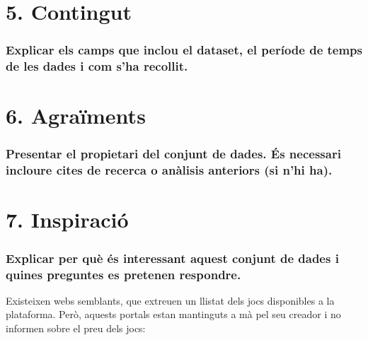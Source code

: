 \documentclass[]{article}
\begin{document}
\hypertarget{contingut}{%
\section{5. Contingut}\label{contingut}}

\hypertarget{explicar-els-camps-que-inclou-el-dataset-el-peruxedode-de-temps-de-les-dades-i-com-sha-recollit.}{%
\subsubsection{Explicar els camps que inclou el dataset, el període de
temps de les dades i com s'ha
recollit.}\label{explicar-els-camps-que-inclou-el-dataset-el-peruxedode-de-temps-de-les-dades-i-com-sha-recollit.}}

\hypertarget{agrauxefments}{%
\section{6. Agraïments}\label{agrauxefments}}

\hypertarget{presentar-el-propietari-del-conjunt-de-dades.-uxe9s-necessari-incloure-cites-de-recerca-o-anuxe0lisis-anteriors-si-nhi-ha.}{%
\subsubsection{Presentar el propietari del conjunt de dades. És
necessari incloure cites de recerca o anàlisis anteriors (si n'hi
ha).}\label{presentar-el-propietari-del-conjunt-de-dades.-uxe9s-necessari-incloure-cites-de-recerca-o-anuxe0lisis-anteriors-si-nhi-ha.}}

\hypertarget{inspiraciuxf3}{%
\section{7. Inspiració}\label{inspiraciuxf3}}

\hypertarget{explicar-per-quuxe8-uxe9s-interessant-aquest-conjunt-de-dades-i-quines-preguntes-es-pretenen-respondre.}{%
\subsubsection{Explicar per què és interessant aquest conjunt de dades i
quines preguntes es pretenen
respondre.}\label{explicar-per-quuxe8-uxe9s-interessant-aquest-conjunt-de-dades-i-quines-preguntes-es-pretenen-respondre.}}

Existeixen webs semblants, que extreuen un llistat dels jocs disponibles
a la plataforma. Però, aquests portals estan mantinguts a mà pel seu
creador i no informen sobre el preu dels jocs:
\end{document}
